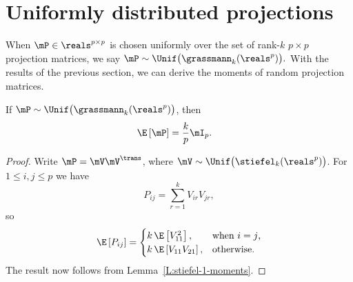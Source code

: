 \section{Uniformly distributed projections}

When $\mP \in \reals^{p \times p}$ is chosen uniformly over the set of rank-$k$ $p \times p$ projection matrices, we say
\(
    \mP
        \sim
            \Unif \big(
                \grassmann_k(\reals^p)
            \big).
\)
With the results of the previous section, we can derive the moments of
random projection matrices.


\begin{lemma}\label{L:grassman-moments-1}
    If $\mP \sim \Unif \big( \grassmann_k(\reals^p) \big)$, then
    \begin{align*}
        \E \left[ \mP \right] &= \frac{k}{p} \mI_p.
    \end{align*}
\end{lemma}
\begin{proof}
    Write $\mP = \mV \mV^\trans$, where 
    \(
        \mV \sim \Unif \big( \stiefel_k( \reals^p ) \big)
    \).
    For $1 \leq i,j \leq p$ we have
    \[
        P_{ij}
            =
                \sum_{r=1}^k V_{ir} V_{jr},
    \]
    so
    \[
        \E \left[ P_{ij} \right] 
        =
        \begin{cases}
            k \, \E \left[ V_{11}^2 \right], &\text{when $i = j$,} \\
            k \, \E \left[ V_{11} V_{21} \right], &\text{otherwise.}
        \end{cases}
    \]
    The result now follows from Lemma~\ref{L:stiefel-1-moments}.
\end{proof}

